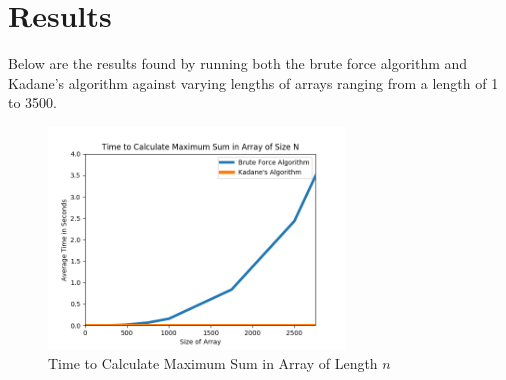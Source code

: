 \documentclass[10pt, letterpaper]{article}
\begin{document}
  \section{Results}

Below are the results found by running both the brute force algorithm and Kadane's algorithm against varying lengths of arrays ranging from a length of 1 to 3500.

	\begin{figure}[htbp]
		\begin{center}
			\includegraphics[width=0.70\textwidth]{python/avgTimeGraph.png}
			\caption{Time to Calculate Maximum Sum in Array of Length $n$}
			\label{fig:time-graph}
		\end{center}
	\end{figure}
\end{document}
